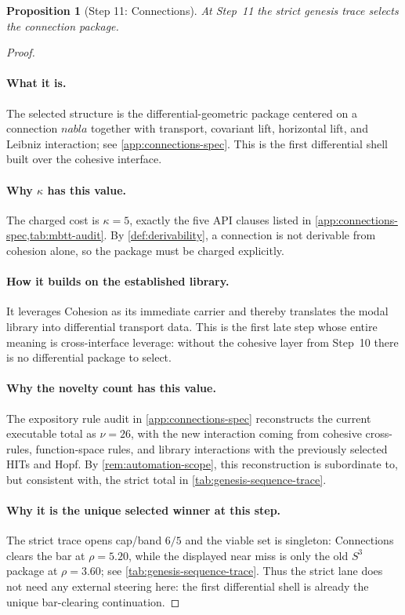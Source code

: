 \documentclass[11pt,a4paper]{article}
\def\nabla{nabla}%
\theoremstyle{plain}
\newtheorem{proposition}[theorem]{Proposition}
\theoremstyle{definition}
\theoremstyle{remark}
\begin{document}
\begin{proposition}[Step 11: Connections]
\label{prop:genesis-step11}
At Step~11 the strict genesis trace selects the connection package.
\end{proposition}

\begin{proof}
\paragraph{What it is.}
The selected structure is the differential-geometric package centered on a
connection $\nabla$ together with transport, covariant lift, horizontal lift,
and Leibniz interaction; see \cref{app:connections-spec}.
This is the first differential shell built over the cohesive interface.

\paragraph{Why $\kappa$ has this value.}
The charged cost is $\kappa=5$, exactly the five API clauses listed in
\cref{app:connections-spec,tab:mbtt-audit}.
By \cref{def:derivability}, a connection is not derivable from cohesion alone,
so the package must be charged explicitly.

\paragraph{How it builds on the established library.}
It leverages Cohesion as its immediate carrier and thereby translates the modal
library into differential transport data.
This is the first late step whose entire meaning is cross-interface leverage:
without the cohesive layer from Step~10 there is no differential package to
select.

\paragraph{Why the novelty count has this value.}
The expository rule audit in \cref{app:connections-spec} reconstructs the
current executable total as $\nu=26$, with the new interaction coming from
cohesive cross-rules, function-space rules, and library interactions with the
previously selected HITs and Hopf.
By \cref{rem:automation-scope}, this reconstruction is subordinate to, but
consistent with, the strict total in \cref{tab:genesis-sequence-trace}.

\paragraph{Why it is the unique selected winner at this step.}
The strict trace opens cap/band $6/5$ and the viable set is singleton:
Connections clears the bar at $\rho=5.20$, while the displayed near miss is only
the old $S^3$ package at $\rho=3.60$; see
\cref{tab:genesis-sequence-trace}.
Thus the strict lane does not need any external steering here: the first
differential shell is already the unique bar-clearing continuation.
\end{proof}
\end{document}
